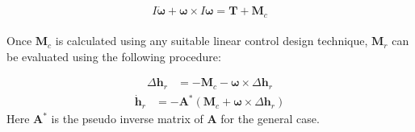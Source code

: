 	\begin{equation*}
		I \dot{\boldsymbol{\omega}} + \boldsymbol{\omega} \times I \boldsymbol{\omega} = \mathbf{T} + \mathbf{M}_c
	\end{equation*}\\
Once \( \mathbf{M}_c \) is calculated using any suitable linear control design technique,  \( \mathbf{M}_r \) can be evaluated using the following procedure:
	
	\begin{align*}
		\Delta \mathbf{h}_r &= -\mathbf{M}_c - \boldsymbol{\omega} \times \Delta \mathbf{h}_r 
	\end{align*}
	\begin{align*}
	\dot{\mathbf{h}}_r &= -\mathbf{A}^* ( \mathbf{M}_c + \boldsymbol{\omega} \times \Delta \mathbf{h}_r )
    \end{align*}
Here \( \mathbf{A}^* \) is the pseudo inverse matrix of \( \mathbf{A} \) for the general case.

	
